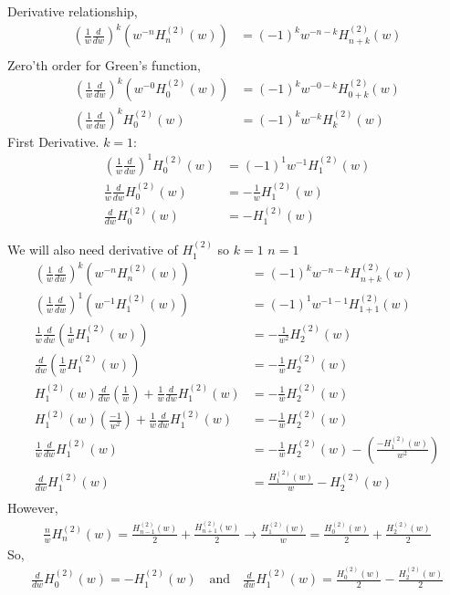 \documentclass{article}
\newcommand{\0}{\varnothing}
\begin{document}
Derivative relationship,
\begin{align*}
    \left(\frac{1}{w}\frac{d}{dw}\right)^k (w^{-n} H_n^{(2)}(w)) &= (-1)^k w^{-n-k} H_{n+k}^{(2)}(w)\\
\end{align*}
Zero'th order for Green's function,
\begin{align*}
    \left(\frac{1}{w}\frac{d}{dw}\right)^k (w^{-0} H_0^{(2)}(w)) &= (-1)^k w^{-0-k} H_{0+k}^{(2)}(w)\\
    \left(\frac{1}{w}\frac{d}{dw}\right)^k H_0^{(2)}(w) &= (-1)^k w^{-k} H_{k}^{(2)}(w)
\end{align*}
First Derivative. $k = 1$:
\begin{align*}
    \left(\frac{1}{w}\frac{d}{dw}\right)^1 H_0^{(2)}(w) &= (-1)^1 w^{-1} H_{1}^{(2)}(w)\\
    \frac{1}{w}\frac{d}{dw} H_0^{(2)}(w) &= - \frac{1}{w} H_{1}^{(2)}(w)\\
    \frac{d}{dw} H_0^{(2)}(w) &= - H_{1}^{(2)}(w)
\end{align*}

We will also need derivative of $H_{1}^{(2)}$ so $k = 1$ $n = 1$
\begin{align*}
    \left(\frac{1}{w}\frac{d}{dw}\right)^k (w^{-n} H_n^{(2)}(w)) &= (-1)^k w^{-n-k} H_{n+k}^{(2)}(w)\\
    \left(\frac{1}{w}\frac{d}{dw}\right)^1 (w^{-1} H_1^{(2)}(w)) &= (-1)^1 w^{-1-1} H_{1+1}^{(2)}(w)\\
    \frac{1}{w}\frac{d}{dw} (\frac{1}{w} H_1^{(2)}(w)) &= - \frac{1}{w^{2}} H_{2}^{(2)}(w)\\
    \frac{d}{dw} (\frac{1}{w} H_1^{(2)}(w)) &= -\frac{1}{w} H_{2}^{(2)}(w)\\
    H_1^{(2)}(w) \frac{d}{dw} \left(\frac{1}{w}\right)  +  \frac{1}{w} \frac{d}{dw}  H_1^{(2)}(w) &= -\frac{1}{w} H_{2}^{(2)}(w)\\
    H_1^{(2)}(w) \left(\frac{-1}{w^2}\right)  +  \frac{1}{w} \frac{d}{dw}  H_1^{(2)}(w) &= -\frac{1}{w} H_{2}^{(2)}(w)\\
    \frac{1}{w} \frac{d}{dw}  H_1^{(2)}(w) &= -\frac{1}{w} H_{2}^{(2)}(w) -  \left(\frac{-H_1^{(2)}(w)}{w^2}\right)\\
    \frac{d}{dw}  H_1^{(2)}(w) &=  \frac{H_1^{(2)}(w)}{w} - H_{2}^{(2)}(w) \\
\end{align*}
However,
\begin{align*}
    \frac{n}{w} H_n^{(2)}(w) = \frac{H_{n-1}^{(2)}(w)}{2} + \frac{H_{n+1}^{(2)}(w)}{2}
    \longrightarrow \frac{H_1^{(2)}(w)}{w}  = \frac{H_{0}^{(2)}(w)}{2} + \frac{H_{2}^{(2)}(w)}{2} 
\end{align*}
So,
\begin{align*}
    \frac{d}{dw} H_0^{(2)}(w) = - H_{1}^{(2)}(w) \quad \text{and} \quad  
    \frac{d}{dw}  H_1^{(2)}(w) =   \frac{H_{0}^{(2)}(w)}{2} - \frac{H_{2}^{(2)}(w)}{2} \\
\end{align*}
\end{document}

